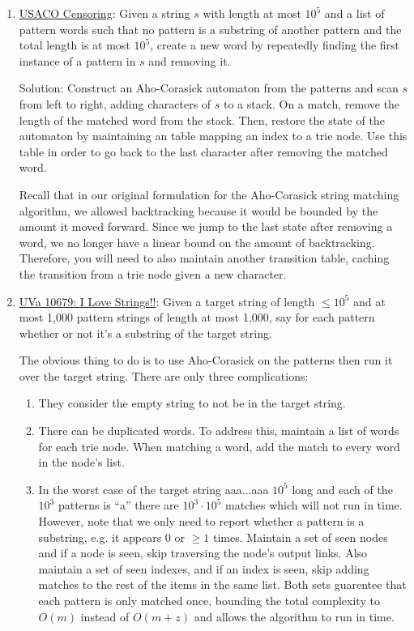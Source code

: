 \documentclass[11pt, oneside]{article}
\begin{document}
\begin{enumerate}
  \item \href{http://www.usaco.org/index.php?page=viewproblem2&cpid=533}{USACO Censoring}:
  Given a string \( s \) with length at most \( 10^5 \) and a list of pattern words such that no pattern
  is a substring of another pattern and the total length is at most \( 10^5 \), create a new word
  by repeatedly finding the first instance of a pattern in \( s \) and removing it.

  Solution: Construct an Aho-Corasick automaton from the patterns and scan \( s \) from left to right, adding
  characters of \( s \) to a stack. On a match, remove the length of the matched word from the stack.
  Then, restore the state of the automaton by maintaining an table mapping an index to a trie node.
  Use this table in order to go back to the last character after removing the matched word.

  Recall that in our original formulation for the Aho-Corasick string matching algorithm,
  we allowed backtracking because it would be bounded by the amount it moved forward.
  Since we jump to the last state after removing a word, we no longer have a linear bound
  on the amount of backtracking. Therefore, you will need to also maintain another transition table,
  caching the transition from a trie node given a new character.

  \item \href{https://onlinejudge.org/index.php?option=onlinejudge&page=show_problem&problem=1620}{UVa 10679: I Love Strings!!}:
  Given a target string of length \( \leq 10^5 \) and at most 1,000 pattern strings of length at most 1,000, say for each pattern
  whether or not it's a substring of the target string.

  The obvious thing to do is to use Aho-Corasick on the patterns then run it over the target string.
  There are only three complications:
  \begin{enumerate}
    \item They consider the empty string to not be in the target string.
    \item There can be duplicated words. To address this, maintain a list of words for each trie node.
    When matching a word, add the match to every word in the node's list.
    \item In the worst case of the target string aaa...aaa \( 10^5 \) long and each of the \( 10^3 \) patterns is ``a''
    there are \( 10^3 \cdot 10^5 \) matches which will not run in time. However, note that we only need to report
    whether a pattern is a substring, e.g. it appears 0 or \( \geq 1 \) times. Maintain a set of seen nodes
    and if a node is seen, skip traversing the node's output links. Also maintain a set of seen indexes,
    and if an index is seen, skip adding matches to the rest of the items in the same list.
    Both sets guarentee that each pattern is only matched once, bounding the total complexity to \( O(m) \) instead
    of \( O(m + z) \) and allows the algorithm to run in time.
  \end{enumerate}


\end{enumerate}
\end{document}
